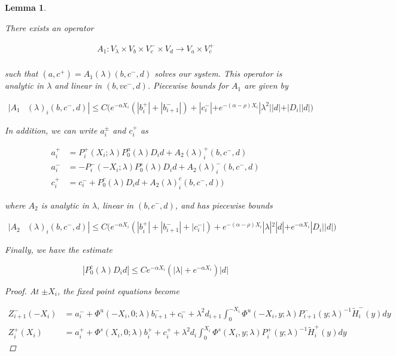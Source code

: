\documentclass[12pt]{article}
\newtheorem{lemma}{Lemma}
\begin{document}
\begin{lemma}\label{inv1}

There exists an operator

\begin{align*}
A_1: V_\lambda \times V_b \times V_c^- \times V_d \rightarrow V_a \times V_c^+\\
\end{align*}

such that $(a, c^+) = A_1(\lambda)(b, c^-,d)$ solves our system. This operator is analytic in $\lambda$ and linear in $(b,vc^-,d)$. Piecewise bounds for $A_1$ are given by

\begin{align}\label{A1bound}
|A_1&(\lambda)_i(b, c^-, d)|
\leq C \Big( e^{-\alpha X_i} (|b_i^+| + |b_{i+1}^-|) + |c_i^-| + e^{-(\alpha - \rho) X_i} |\lambda^2||d| + |D_i||d| \Big)
\end{align} 

In addition, we can write $a_i^\pm$ and $c_i^+$ as 

\begin{align*}
a_i^+ &= P_i^+(X_i; \lambda) P_0^u(\lambda) D_i d + A_2(\lambda)_i^+(b, c^-, d) \\
a_i^- &= -P_i^-(-X_i; \lambda) P_0^s(\lambda) D_i d + A_2(\lambda)_i^-(b, c^-, d) \\
c_i^+ &= c_i^- + P_0^c(\lambda) D_i d + A_2(\lambda)_i^c(b, c^-, d) )
\end{align*}

where $A_2$ is analytic in $\lambda$, linear in $(b, c^-, d)$, and has piecewise bounds

\begin{align*}
|A_2&(\lambda)_i(b, c^-, d)|
\leq C \Big( e^{-\alpha X_i} (|b_i^+| + |b_{i+1}^-| + |c_i^-|) + e^{-(\alpha - \rho) X_i} |\lambda|^2|d| + e^{-\alpha X_i} |D_i||d| \Big)
\end{align*}

Finally, we have the estimate

\begin{equation}\label{P0cDid}
|P_0^c(\lambda) D_i d| \leq C e^{-\alpha X_i}(|\lambda| + e^{-\alpha X_i})|d|
\end{equation}

\begin{proof}

At $\pm X_i$, the fixed point equations become

\begin{align*}
Z_{i+1}^-(-X_i) &= a_i^- + \Phi^u(-X_i, 0; \lambda) b_{i+1}^- + c_i^- 
+ \lambda^2 d_{i+1} \int_0^{-X_i} \Phi^u(-X_i, y; \lambda) P_{i+1}^-(y; \lambda)^{-1} \tilde{H}_i^-(y) dy \\
Z_i^+(X_i) &= a_i^+ + \Phi^s(X_i, 0; \lambda) b_i^+ + c_i^+ 
+ \lambda^2 d_i \int_0^{X_i} \Phi^s(X_i, y; \lambda) P_i^+(y; \lambda)^{-1} \tilde{H}_i^+(y) dy
\end{align*}


\end{proof}
\end{lemma}
\end{document}
